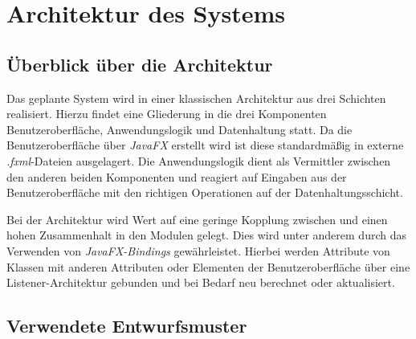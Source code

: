 \documentclass[11pt]{article}
\begin{document}
\newpage

\section{Architektur des Systems}

\subsection{Überblick über die Architektur}

Das geplante System wird in einer klassischen Architektur aus drei Schichten realisiert. Hierzu findet eine Gliederung in die drei Komponenten Benutzeroberfläche, Anwendungslogik und Datenhaltung statt. Da die Benutzeroberfläche über \textit{JavaFX} erstellt wird ist diese standardmäßig in externe \textit{.fxml}-Dateien ausgelagert. Die Anwendungslogik dient als Vermittler zwischen den anderen beiden Komponenten und reagiert auf Eingaben aus der Benutzeroberfläche mit den richtigen Operationen auf der Datenhaltungsschicht.

Bei der Architektur wird Wert auf eine geringe Kopplung zwischen und einen hohen Zusammenhalt in den Modulen gelegt. Dies wird unter anderem durch das Verwenden von \textit{JavaFX-Bindings} gewährleistet. Hierbei werden Attribute von Klassen mit anderen Attributen oder Elementen der Benutzeroberfläche über eine Listener-Architektur gebunden und bei Bedarf neu berechnet oder aktualisiert.

\subsection{Verwendete Entwurfsmuster}
\end{document}

